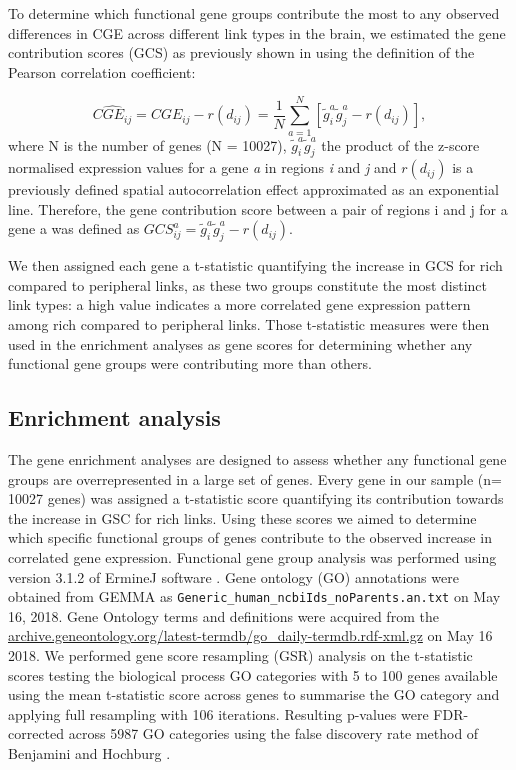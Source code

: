 To determine which functional gene groups contribute the most to any observed differences in CGE across different link types in the brain, we estimated the gene contribution scores (GCS) as previously shown in \citep{Fulcher2016} using the definition of the Pearson correlation coefficient:

\begin{equation}
    \label{eqn:Ch5Eq5}
    \widehat{CGE_{ij}} = CGE_{ij} - r(d_{ij}) = \frac{1}{N}\sum_{a=1}^{N}[\widetilde{g}_{i}^{a}\widetilde{g}_{j}^{a} - r(d_{ij})],
\end{equation}
where N is the number of genes (N = \num{10 027}), $\widetilde{g}_{i}^{a} \widetilde{g}_{j}^{a}$ the product of the z-score normalised expression values for a gene \textit{a} in regions \textit{i} and \textit{j} and $r(d_{ij})$ is a previously defined spatial autocorrelation effect approximated as an exponential line. Therefore, the gene contribution score between a pair of regions i and j for a gene a was defined as $GCS_{ij}^{a}= \widetilde{g}_{i}^{a}\widetilde{g}_{j}^{a} - r(d_{ij})$.

We then assigned each gene a t-statistic quantifying the increase in GCS for rich compared to peripheral links, as these two groups constitute the most distinct link types: a high value indicates a more correlated gene expression pattern among rich compared to peripheral links. Those t-statistic measures were then used in the enrichment analyses as gene scores for determining whether any functional gene groups were contributing more than others.

\subsection{Enrichment analysis}
\label{sec:enrichment}
The gene enrichment analyses are designed to assess whether any functional gene groups are overrepresented in a large set of genes. Every gene in our sample (n= \num{10027} genes) was assigned a t-statistic score quantifying its contribution towards the increase in GSC for rich links. Using these scores we aimed to determine which specific functional groups of genes contribute to the observed increase in correlated gene expression. Functional gene group analysis was performed using version 3.1.2 of ErmineJ software \citep{Gillis2010}. Gene ontology (GO) \citep{Ashburner2000} annotations were obtained from GEMMA \citep{Zoubarev2012} as \texttt{Generic\_human\_ncbiIds\_noParents.an.txt} on May 16, 2018. Gene Ontology terms and definitions were acquired from the \url{archive.geneontology.org/latest-termdb/go_daily-termdb.rdf-xml.gz} on May 16 2018. We performed gene score resampling (GSR) analysis on the t-statistic scores testing the biological process GO categories with 5 to 100 genes available using the mean t-statistic score across genes to summarise the GO category and applying full resampling with 106 iterations. Resulting p-values were FDR-corrected across \num{5987} GO categories using the false discovery rate method of Benjamini and Hochburg \citep{Benjamini1995}.

